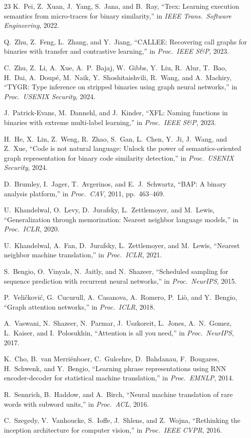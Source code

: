 \documentclass[sigconf,nonacm]{acmart}
\begin{document}
\begin{thebibliography}{23}
K.~Pei, Z.~Xuan, J.~Yang, S.~Jana, and B.~Ray, ``Trex: Learning execution semantics from micro-traces for binary similarity,'' in \emph{IEEE Trans.\ Software Engineering}, 2022.

Q.~Zhu, Z.~Feng, L.~Zhang, and Y.~Jiang, ``CALLEE: Recovering call graphs for binaries with transfer and contrastive learning,'' in \emph{Proc.\ IEEE S\&P}, 2023.

C.~Zhu, Z.~Li, A.~Xue, A.~P.~Bajaj, W.~Gibbs, Y.~Liu, R.~Alur, T.~Bao, H.~Dai, A.~Doup\'{e}, M.~Naik, Y.~Shoshitaishvili, R.~Wang, and A.~Machiry, ``TYGR: Type inference on stripped binaries using graph neural networks,'' in \emph{Proc.\ USENIX Security}, 2024.

J.~Patrick-Evans, M.~Dannehl, and J.~Kinder, ``XFL: Naming functions in binaries with extreme multi-label learning,'' in \emph{Proc.\ IEEE S\&P}, 2023.

H.~He, X.~Lin, Z.~Weng, R.~Zhao, S.~Gan, L.~Chen, Y.~Ji, J.~Wang, and Z.~Xue, ``Code is not natural language: Unlock the power of semantics-oriented graph representation for binary code similarity detection,'' in \emph{Proc.\ USENIX Security}, 2024.

D.~Brumley, I.~Jager, T.~Avgerinos, and E.~J.~Schwartz, ``BAP: A binary analysis platform,'' in \emph{Proc.\ CAV}, 2011, pp.~463--469.

U.~Khandelwal, O.~Levy, D.~Jurafsky, L.~Zettlemoyer, and M.~Lewis, ``Generalization through memorization: Nearest neighbor language models,'' in \emph{Proc.\ ICLR}, 2020.

U.~Khandelwal, A.~Fan, D.~Jurafsky, L.~Zettlemoyer, and M.~Lewis, ``Nearest neighbor machine translation,'' in \emph{Proc.\ ICLR}, 2021.

S.~Bengio, O.~Vinyals, N.~Jaitly, and N.~Shazeer, ``Scheduled sampling for sequence prediction with recurrent neural networks,'' in \emph{Proc.\ NeurIPS}, 2015.

P.~Veli\v{c}kovi\'{c}, G.~Cucurull, A.~Casanova, A.~Romero, P.~Li\`{o}, and Y.~Bengio, ``Graph attention networks,'' in \emph{Proc.\ ICLR}, 2018.

A.~Vaswani, N.~Shazeer, N.~Parmar, J.~Uszkoreit, L.~Jones, A.~N.~Gomez, L.~Kaiser, and I.~Polosukhin, ``Attention is all you need,'' in \emph{Proc.\ NeurIPS}, 2017.

K.~Cho, B.~van Merri\"{e}nboer, C.~Gulcehre, D.~Bahdanau, F.~Bougares, H.~Schwenk, and Y.~Bengio, ``Learning phrase representations using RNN encoder-decoder for statistical machine translation,'' in \emph{Proc.\ EMNLP}, 2014.

R.~Sennrich, B.~Haddow, and A.~Birch, ``Neural machine translation of rare words with subword units,'' in \emph{Proc.\ ACL}, 2016.

C.~Szegedy, V.~Vanhoucke, S.~Ioffe, J.~Shlens, and Z.~Wojna, ``Rethinking the inception architecture for computer vision,'' in \emph{Proc.\ IEEE CVPR}, 2016.

\end{thebibliography}
\end{document}

